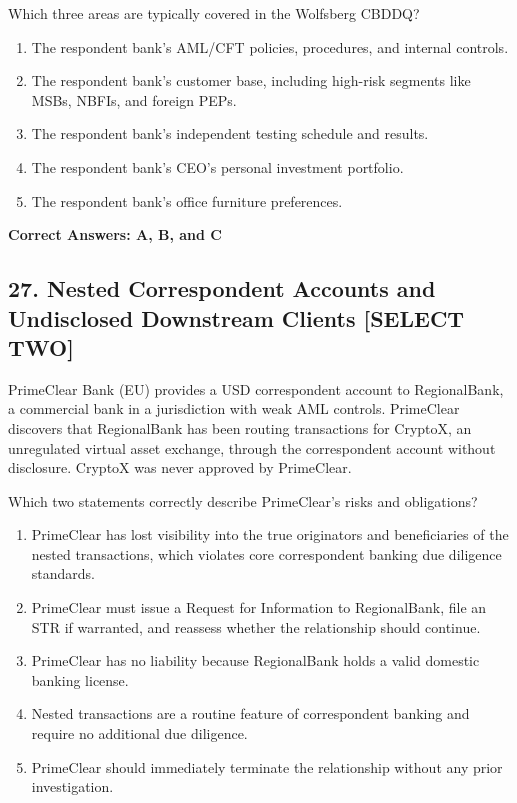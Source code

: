 \documentclass[11pt,a4paper]{article}
\begin{document}
	Which three areas are typically covered in the Wolfsberg CBDDQ?
	
	\begin{enumerate}[label=\Alph*.]
		\item The respondent bank's AML/CFT policies, procedures, and internal controls.
		\item The respondent bank's customer base, including high-risk segments like MSBs, NBFIs, and foreign PEPs.
		\item The respondent bank's independent testing schedule and results.
		\item The respondent bank's CEO's personal investment portfolio.
		\item The respondent bank's office furniture preferences.
	\end{enumerate}
	
	\textbf{Correct Answers: A, B, and C}
	
	\subsection{27. Nested Correspondent Accounts and Undisclosed Downstream Clients \textnormal{[SELECT TWO]}}
	
	PrimeClear Bank (EU) provides a USD correspondent account to RegionalBank, a commercial bank in a jurisdiction with weak AML controls. PrimeClear discovers that RegionalBank has been routing transactions for CryptoX, an unregulated virtual asset exchange, through the correspondent account without disclosure. CryptoX was never approved by PrimeClear.
	
	Which two statements correctly describe PrimeClear's risks and obligations?
	
	\begin{enumerate}[label=\Alph*.]
		\item PrimeClear has lost visibility into the true originators and beneficiaries of the nested transactions, which violates core correspondent banking due diligence standards.
		\item PrimeClear must issue a Request for Information to RegionalBank, file an STR if warranted, and reassess whether the relationship should continue.
		\item PrimeClear has no liability because RegionalBank holds a valid domestic banking license.
		\item Nested transactions are a routine feature of correspondent banking and require no additional due diligence.
		\item PrimeClear should immediately terminate the relationship without any prior investigation.
	\end{enumerate}
	
\end{document}
